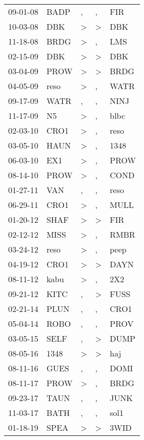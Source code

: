 \begin{supertabular}{lllll}
 09-01-08 &  BADP &             , &             , &   FIR \\
 10-03-08 &   DBK &  \textgreater &  \textgreater &   DBK \\
 11-18-08 &  BRDG &  \textgreater &             , &   LMS \\
 02-15-09 &   DBK &  \textgreater &  \textgreater &   DBK \\
 03-04-09 &  PROW &  \textgreater &  \textgreater &  BRDG \\
 04-05-09 &  reso &  \textgreater &             , &  WATR \\
 09-17-09 &  WATR &             , &             , &  NINJ \\
 11-17-09 &    N5 &  \textgreater &             , &  blbc \\
 02-03-10 &  CRO1 &  \textgreater &             , &  reso \\
 03-05-10 &  HAUN &  \textgreater &             , &  1348 \\
 06-03-10 &   EX1 &  \textgreater &             , &  PROW \\
 08-14-10 &  PROW &  \textgreater &             , &  COND \\
 01-27-11 &   VAN &             , &             , &  reso \\
 06-29-11 &  CRO1 &  \textgreater &             , &  MULL \\
 01-20-12 &  SHAF &  \textgreater &  \textgreater &   FIR \\
 02-12-12 &  MISS &  \textgreater &             , &  RMBR \\
 03-24-12 &  reso &  \textgreater &             , &  peep \\
 04-19-12 &  CRO1 &  \textgreater &  \textgreater &  DAYN \\
 08-11-12 &  kabu &  \textgreater &             , &   2X2 \\
 09-21-12 &  KITC &             , &  \textgreater &  FUSS \\
 02-21-14 &  PLUN &             , &             , &  CRO1 \\
 05-04-14 &  ROBO &             , &             , &  PROV \\
 03-05-15 &  SELF &             , &  \textgreater &  DUMP \\
 08-05-16 &  1348 &  \textgreater &  \textgreater &   haj \\
 08-11-16 &  GUES &             , &             , &  DOMI \\
 08-11-17 &  PROW &  \textgreater &             , &  BRDG \\
 09-23-17 &  TAUN &             , &             , &  JUNK \\
 11-03-17 &  BATH &             , &             , &  sol1 \\
 01-18-19 &  SPEA &  \textgreater &  \textgreater &  3WID \\
\end{supertabular}
